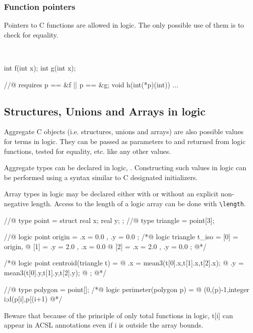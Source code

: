 \subsubsection{Function pointers}

Pointers to C functions are allowed in logic. The only possible use of
them is to check for equality.

\begin{example}
~
\begin{listing-nonumber}
int f(int x);
int g(int x);

//@ requires p == &f || p == &g;
void h(int(*p)(int)) {
...
}
\end{listing-nonumber}
\end{example}

\subsection{Structures, Unions and Arrays in logic}
\label{sec:aggregate}

Aggregate C objects (i.e. structures, unions and arrays) are also
possible values for terms in logic. They can be passed as parameters to and returned from logic functions, tested for equality, etc. like any
other values.

Aggregate types can be declared in logic,
. Constructing such values in logic can be
performed using a syntax similar to C designated initializers.

\begin{example}
Array types in logic may be declared either with or without an
explicit non-negative length. Access to the length of a logic array
can be done with \lstinline|\length|.

\begin{listing-nonumber}
//@ type point = struct { real x; real y; };
//@ type triangle = point[3];

//@ logic point origin = { .x = 0.0 , .y = 0.0 };
/*@ logic triangle t_iso = { [0] = origin,
  @                          [1] = { .y = 2.0 , .x = 0.0 }
  @                          [2] = { .x = 2.0 , .y = 0.0 }};
  @*/

/*@ logic point centroid(triangle t) = {
  @    .x = mean3(t[0].x,t[1].x,t[2].x);
  @    .y = mean3(t[0].y,t[1].y,t[2].y);
  @ };
  @*/

//@ type polygon = point[];
/*@ logic perimeter(polygon p) =
  @   \sum(0,\length(p)-1,\lambda integer i;d(p[i],p[(i+1) %
  @*/
\end{listing-nonumber}
Beware that because of the principle of only total functions in logic,
t[i] can appear in ACSL annotations even if i is outside the array bounds.

\end{example}

